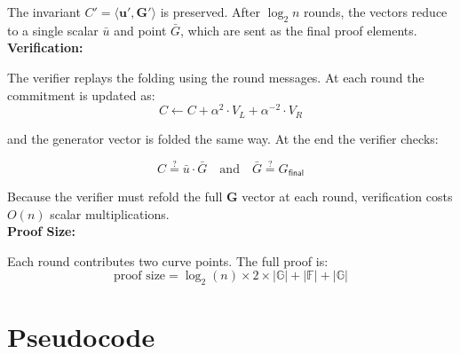 The invariant $C' = \langle \mathbf{u}', \mathbf{G}' \rangle$ is
preserved. After $\log_2 n$ rounds, the vectors reduce to a single
scalar $\bar{u}$ and point $\bar{G}$, which are sent as the final
proof elements.
\\
\textbf{Verification:}

The verifier replays the folding using the round messages. At each
round the commitment is updated as:
\begin{equation}
    C \gets C + \alpha^2 \cdot V_L + \alpha^{-2} \cdot V_R
\end{equation}

and the generator vector is folded the same way. At the end the
verifier checks:

\begin{equation}
    C \stackrel{?}{=} \bar{u} \cdot \bar{G}
    \quad \text{and} \quad
    \bar{G} \stackrel{?}{=} G_{\mathsf{final}}
\end{equation}

Because the verifier must refold the full $\mathbf{G}$ vector at
each round, verification costs $O(n)$ scalar multiplications.
\\
\textbf{Proof Size:}

Each round contributes two curve points. The full proof is:
\begin{equation}
    \text{proof size}
    = \log_2(n) \times 2 \times |\mathbb{G}|
    + |\mathbb{F}| + |\mathbb{G}|
\end{equation}

\section{Pseudocode}

